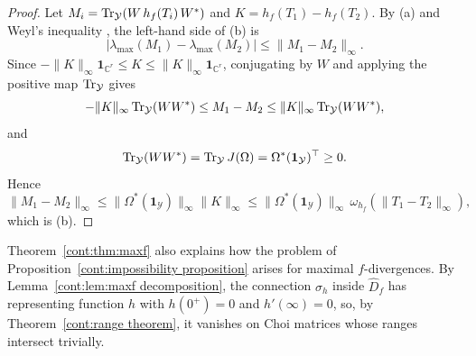 \begin{proof}
Let $M_i=\operatorname{Tr}_{\mathcal{Y}}(W\,h_f(T_i)\,W^*)$ and $K=h_f(T_1)-h_f(T_2)$. By (a) and
Weyl's inequality \cite[Section~III.2]{bhatia1997matrix}, the left-hand side of (b) is
\[
|\lambda_{\max}(M_1)-\lambda_{\max}(M_2)|\leq\|M_1-M_2\|_\infty.
\]
Since
$-\|K\|_\infty\mathbf{1}_{\mathbb{C}^r}\leq K\leq\|K\|_\infty\mathbf{1}_{\mathbb{C}^r}$, conjugating by $W$ and applying the positive map
$\operatorname{Tr}_{\mathcal{Y}}$ gives
\[
-\|K\|_\infty\operatorname{Tr}_{\mathcal{Y}}(WW^*)\leq M_1-M_2\leq\|K\|_\infty\operatorname{Tr}_{\mathcal{Y}}(WW^*),
\]
and
\[
\operatorname{Tr}_{\mathcal{Y}}(WW^*)=\operatorname{Tr}_{\mathcal{Y}}J(\Omega)=\Omega^*(\mathbf{1}_{\mathcal{Y}})^\top\geq0.
\]
Hence
\[
\|M_1-M_2\|_\infty\leq\|\Omega^*(\mathbf{1}_{\mathcal{Y}})\|_\infty\|K\|_\infty
\leq\|\Omega^*(\mathbf{1}_{\mathcal{Y}})\|_\infty\,\omega_{h_f}(\|T_1-T_2\|_\infty),
\]
which is (b).
\end{proof}
 
Theorem~\ref{cont:thm:maxf} also explains how the problem of Proposition~\ref{cont:impossibility proposition} arises for maximal $f$-divergences. By Lemma~\ref{cont:lem:maxf decomposition}, the connection $\sigma_h$ inside $\widehat{D}_f$ has representing function $h$ with $h(0^+)=0$ and $h'(\infty)=0$, so, by Theorem~\ref{cont:range theorem}, it vanishes on Choi matrices whose ranges intersect trivially.
 
